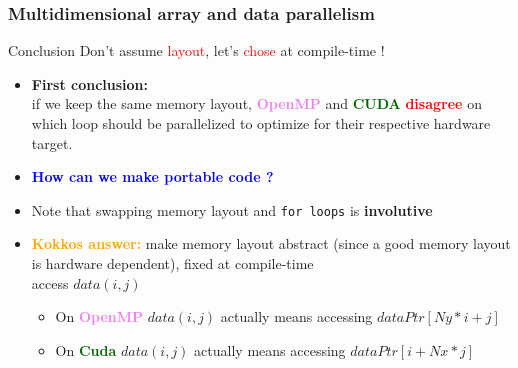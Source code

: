 \begin{frame}[fragile=singleslide]
  \frametitle{Multidimensional array and data parallelism}

  \begin{block}{Conclusion}
    {\Large Don't assume \textcolor{red}{layout}, let's \textcolor{red}{chose} at compile-time !}
  \end{block}
  
  \begin{itemize}
  \item {\bf First conclusion:}\\
    if we keep the same memory layout, \textcolor{violet}{\bf OpenMP} and \textcolor{darkgreen}{\bf CUDA} \textcolor{red}{\bf disagree} on which loop should be parallelized to optimize for their respective hardware target.
  \item \textcolor{blue}{\bf How can we make portable code ?}
  \item Note that swapping memory layout and {\tt for loops} is {\bf involutive}
  \item \textcolor{orange}{\bf Kokkos answer:} make memory layout abstract (since a good memory layout is hardware dependent), fixed at compile-time\\
    access $data(i,j)$
    \begin{itemize}
    \item On \textcolor{violet}{\bf OpenMP} $data(i,j)$ actually means accessing $dataPtr[Ny*i+j]$
    \item On \textcolor{darkgreen}{\bf Cuda} $data(i,j)$ actually means accessing $dataPtr[i+Nx*j]$
    \end{itemize}
  \end{itemize}
  
\end{frame}

